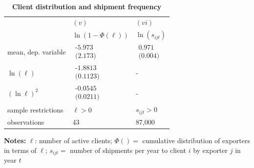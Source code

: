 \documentclass[12pt]{article}
\begin{document}
\begin{table}[tbp]
\caption{\textbf{Client distribution and shipment frequency}}
\label{tab:client_dist}\centering
{\small \ }
\par
{\small 
\begin{tabular}{lll}
\hline\hline
& $(v)$ & $(vi)$ \\ 
& $\ln (1-\Phi (\ell ))$ & $\ln (s_{ijt})$ \\ \hline
mean, dep. variable & $%
\begin{array}{c}
\text{-5.973} \\ 
\text{(2.173)}%
\end{array}%
$ & $%
\begin{array}{c}
\text{0.971 } \\ 
\text{(0.004)}%
\end{array}%
$ \\ 
$\ln (\ell )$ & $%
\begin{array}{c}
\text{-1.8813 } \\ 
\text{(0.1123)}%
\end{array}%
$ & - \\ 
$(\ln \ell )^{2}$ & $%
\begin{array}{c}
\text{-0.0545 } \\ 
\text{(0.0211)}%
\end{array}%
$ & - \\ \hline
sample restrictions & $\ell >0$ & $s_{ijt}>0$ \\ 
observations & 43 & 87,000 \\ \hline
\end{tabular}
} \endcenter%
\begin{tablenotes}
\item \textbf{Notes:}     {\footnotesize $\ell$: number of active clients;  $\Phi ( ) = $ cumulative distribution of exporters in terms of  $\ell$;
$s_{ijt}=$ number of shipments per year to client $i$ by exporter $j$ in year $t$}
\end{tablenotes}
\end{table}
\end{document}
